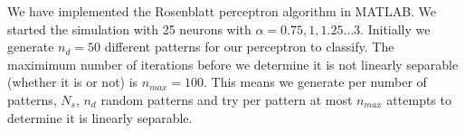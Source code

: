 We have implemented the Rosenblatt perceptron algorithm in MATLAB. We started the simulation with 25 neurons with $\alpha = 0.75, 1, 1.25 \dots 3$. Initially we generate $n_d = 50$ different patterns for our perceptron to classify. The maximimum number of iterations before we determine it is not linearly separable (whether it is or not) is $n_{max} = 100$. This means we generate per number of patterns, $N_s$, $n_d$ random patterns and try per pattern at most $n_{max}$ attempts to determine it is linearly separable.  